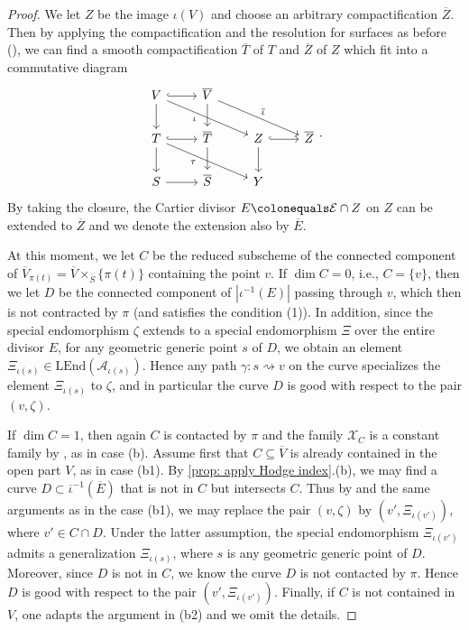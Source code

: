 \documentclass[11pt, letterpaper]{amsart}
\theoremstyle{plain}
\theoremstyle{definition}
\newcommand{\<}{\langle}
\renewcommand{\>}{\rangle}
\newcommand{\sE}{\mathcal{E}}
\newcommand{\sA}{\mathcal{A}}
\newcommand{\sX}{\mathcal{X}}
\newcommand{\LEnd}{\mathrm{LEnd}}
\begin{document}
\begin{proof}
    
    We let $Z$ be the image $\iota(V)$ and choose an arbitrary compactification $\overline{Z}$. 
    Then by applying the compactification and the resolution for surfaces as before (\cite[\href{https://stacks.math.columbia.edu/tag/0C5H}{Tag 0C5H}]{stacks-project}), we can find a smooth compactification $\overline{T}$ of $T$ and $\overline{Z}$ of $Z$ which fit into a commutative diagram 
    \begin{equation}
        \begin{tikzcd}
	V & {\overline{V}} \\
	T & {\overline{T}} & Z & {\overline{Z}} \\
	S & {\overline{S}} & Y
	\arrow[hook, from=1-1, to=1-2]
	\arrow[from=1-1, to=2-1]
	\arrow["\iota"'{pos=0.4}, from=1-1, to=2-3]
	\arrow[from=1-2, to=2-2]
	\arrow["{{\overline{\iota}}}", from=1-2, to=2-4]
	\arrow[hook, from=2-1, to=2-2]
	\arrow[from=2-1, to=3-1]
	\arrow["\tau"'{pos=0.4}, from=2-1, to=3-3]
	\arrow[from=2-2, to=3-2]
	\arrow[hook, from=2-3, to=2-4]
	\arrow[from=2-3, to=3-3]
	\arrow[from=3-1, to=3-2]
\end{tikzcd}. 
    \end{equation}
    By taking the closure, the Cartier divisor $E \colonequals \sE \cap Z$ on $Z$ can be extended to $\overline{Z}$ and we denote the extension also by $\overline{E}$. 

    At this moment, we let $C$ be the reduced subscheme of the connected component of $\overline{V}_{\pi(t)}=\overline{V}\times_{\overline{S}} \{\pi(t)\}$ containing the point $v$. 
    If $\dim C = 0$, i.e., $C = \{v\}$, then we let $D$ be the connected component of $|\iota^{-1}(E)|$ passing through $v$, which then is not contracted by $\pi$ (and satisfies the condition (1)).
    In addition, since the special endomorphism $\zeta$ extends to a special endomorphism $\Xi$ over the entire divisor $E$, for any geometric generic point $s$ of $D$, we obtain an element $\Xi_{\iota(s)} \in \LEnd(\sA_{\iota(s)})$.
    Hence any path $\gamma:s \rightsquigarrow v$ on the curve specializes the element $\Xi_{\iota(s)}$ to $\zeta$, and in particular the curve $D$ is good with respect to the pair $(v, \zeta)$.

    
    If $\dim C = 1$, then again $C$ is contacted by $\pi$ and the family $\sX_C$ is a constant family by , as in case (b).
    Assume first that $C \subseteq \overline{V}$ is already contained in the open part $V$, as in case (b1). 
    By \cref{prop: apply Hodge index}.(b), we may find a curve $D \subset \overline{\iota}^{-1}(\overline{E})$ that is not in $C$ but intersects $C$. 
    Thus by  and the same arguments as in the case (b1), we may replace the pair $(v, \zeta)$ by $(v', \Xi_{\iota(v')})$, where  $v' \in C \cap D$.
    Under the latter assumption, the special endomorphism $\Xi_{\iota(v')}$ admits a generalization $\Xi_{\iota(s)}$, where $s$ is any geometric generic point of $D$.
    Moreover, since $D$ is not in $C$, we know the curve $D$ is not contacted by $\pi$.
    Hence $D$ is good with respect to the pair $(v', \Xi_{\iota(v')})$. 
    Finally, if $C$ is not contained in $V$, one adapts the argument in (b2) and we omit the details. 
\end{proof}
\end{document}
